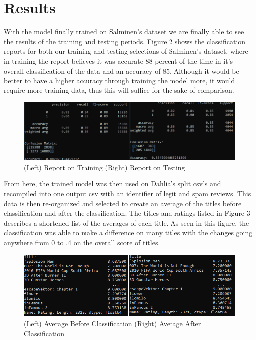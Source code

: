 \documentclass{article}
\begin{document}
\section{Results}
\hspace{\parindent} With the model finally trained on Salminen's dataset we are finally able to see the results of the training and testing periods. Figure 2 shows the classification reports for both our training and testing selections of Salminen's dataset, where in training the report believes it was accurate 88 percent of the time in it's overall classification of the data and an accuracy of 85. Although it would be better to have a higher accuracy through training the model more, it would require more training data, thus this will suffice for the sake of comparison. \\
    \begin{figure}[h]
        \centering
        \includegraphics[scale=.6]{capture2.png}
        \caption{(Left) Report on Training (Right) Report on Testing}
    \end{figure}
\par From here, the trained model was then used on Dahlia's split csv's and recompiled into one output csv with an identifier of legit and spam reviews. This data is then re-organized and selected to create an average of the titles before classification and after the classification. The titles and ratings listed in Figure 3 describes a shortened list of the averages of each title. As seen in this figure, the classification was able to make a difference on many titles with the changes going anywhere from 0 to .4 on the overall score of titles.
\begin{figure}[h]
        \centering
        \includegraphics[scale=.75]{Averages.png}
        \caption{(Left) Average Before Classification (Right) Average After Classification}
    \end{figure}
\end{document}
